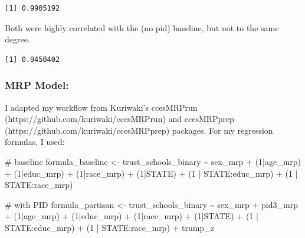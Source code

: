 \documentclass[
  letterpaper,
  DIV=11,
  numbers=noendperiod]{scrartcl}
\newenvironment{Shaded}{\begin{snugshade}}{\end{snugshade}}
\newcommand{\CommentTok}[1]{\textcolor[rgb]{0.37,0.37,0.37}{#1}}
\newcommand{\DecValTok}[1]{\textcolor[rgb]{0.68,0.00,0.00}{#1}}
\newcommand{\FunctionTok}[1]{\textcolor[rgb]{0.28,0.35,0.67}{#1}}
\newcommand{\NormalTok}[1]{\textcolor[rgb]{0.00,0.23,0.31}{#1}}
\newcommand{\OtherTok}[1]{\textcolor[rgb]{0.00,0.23,0.31}{#1}}
\newcommand{\SpecialCharTok}[1]{\textcolor[rgb]{0.37,0.37,0.37}{#1}}
\begin{document}
\begin{verbatim}
[1] 0.9905192
\end{verbatim}

Both were highly correlated with the (no pid) baseline, but not to the
same degree.

\begin{Shaded}
\end{Shaded}

\begin{verbatim}
[1] 0.9450402
\end{verbatim}

\subsubsection{MRP Model:}\label{mrp-model}

I adapted my workflow from Kuriwaki's ccesMRPrun
(https://github.com/kuriwaki/ccesMRPrun) and ccesMRPprep
(https://github.com/kuriwaki/ccesMRPprep) packages. For my regression
formulas, I used:

\begin{Shaded}
\begin{Highlighting}[]
\CommentTok{\# baseline}
\NormalTok{formula\_baseline }\OtherTok{\textless{}{-}}\NormalTok{ trust\_schools\_binary }\SpecialCharTok{\textasciitilde{}}\NormalTok{  sex\_mrp }\SpecialCharTok{+} 
\NormalTok{  (}\DecValTok{1}\SpecialCharTok{|}\NormalTok{age\_mrp) }\SpecialCharTok{+}\NormalTok{ (}\DecValTok{1}\SpecialCharTok{|}\NormalTok{educ\_mrp) }\SpecialCharTok{+}\NormalTok{ (}\DecValTok{1}\SpecialCharTok{|}\NormalTok{race\_mrp) }\SpecialCharTok{+}\NormalTok{ (}\DecValTok{1}\SpecialCharTok{|}\NormalTok{STATE) }\SpecialCharTok{+}
\NormalTok{  (}\DecValTok{1} \SpecialCharTok{|}\NormalTok{ STATE}\SpecialCharTok{:}\NormalTok{educ\_mrp) }\SpecialCharTok{+}\NormalTok{ (}\DecValTok{1} \SpecialCharTok{|}\NormalTok{ STATE}\SpecialCharTok{:}\NormalTok{race\_mrp)}

\CommentTok{\# with PID}
\NormalTok{formula\_partisan }\OtherTok{\textless{}{-}}\NormalTok{ trust\_schools\_binary }\SpecialCharTok{\textasciitilde{}}\NormalTok{  sex\_mrp }\SpecialCharTok{+}\NormalTok{ pid3\_mrp }\SpecialCharTok{+} 
\NormalTok{  (}\DecValTok{1}\SpecialCharTok{|}\NormalTok{age\_mrp) }\SpecialCharTok{+}\NormalTok{ (}\DecValTok{1}\SpecialCharTok{|}\NormalTok{educ\_mrp) }\SpecialCharTok{+}\NormalTok{ (}\DecValTok{1}\SpecialCharTok{|}\NormalTok{race\_mrp) }\SpecialCharTok{+}\NormalTok{ (}\DecValTok{1}\SpecialCharTok{|}\NormalTok{STATE) }\SpecialCharTok{+}
\NormalTok{  (}\DecValTok{1} \SpecialCharTok{|}\NormalTok{ STATE}\SpecialCharTok{:}\NormalTok{educ\_mrp) }\SpecialCharTok{+}\NormalTok{ (}\DecValTok{1} \SpecialCharTok{|}\NormalTok{ STATE}\SpecialCharTok{:}\NormalTok{race\_mrp) }\SpecialCharTok{+}\NormalTok{ trump\_z}
\end{Highlighting}
\end{Shaded}
\end{document}
